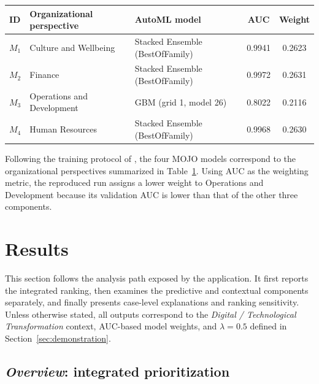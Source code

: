 \documentclass{interact}
\begin{document}
\begin{table}[!t]
{\footnotesize
\begin{tabularx}{\textwidth}{lllcc}
\toprule
\textbf{ID} & \textbf{Organizational perspective} & \textbf{AutoML model} & \textbf{AUC} & \textbf{Weight} \\
\midrule
$M_1$ & Culture and Wellbeing & Stacked Ensemble (BestOfFamily) & 0.9941 & 0.2623 \\
$M_2$ & Finance & Stacked Ensemble (BestOfFamily) & 0.9972 & 0.2631 \\
$M_3$ & Operations and Development & GBM (grid 1, model 26) & 0.8022 & 0.2116 \\
$M_4$ & Human Resources & Stacked Ensemble (BestOfFamily) & 0.9968 & 0.2630 \\
\bottomrule
\end{tabularx}}
\label{tab:tool_model_weights}
\end{table}

Following the training protocol of \citet{Godz2026}, the four MOJO models correspond to the organizational perspectives summarized in Table~\ref{tab:tool_model_weights}. Using AUC as the weighting metric, the reproduced run assigns a lower weight to Operations and Development because its validation AUC is lower than that of the other three components.

\section{Results}\label{sec:results}

This section follows the analysis path exposed by the application. It first reports the integrated ranking, then examines the predictive and contextual components separately, and finally presents case-level explanations and ranking sensitivity. Unless otherwise stated, all outputs correspond to the \textit{Digital / Technological Transformation} context, AUC-based model weights, and $\lambda=0.5$ defined in Section~\ref{sec:demonstration}.

\subsection{\textit{Overview}: integrated prioritization}
\end{document}
